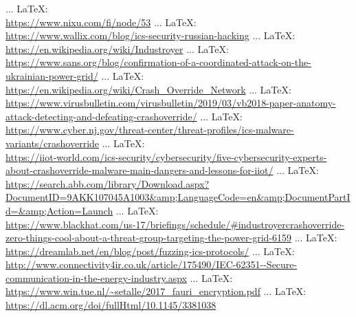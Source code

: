 \begin{thebibliography}{99}
{{{{		
		
		
		 ... \LaTeX:\\ \url{https://www.nixu.com/fi/node/53}
		 ... \LaTeX:\\ \url{ https://www.wallix.com/blog/ics-security-russian-hacking}
		 ... \LaTeX:\\ \url{ https://en.wikipedia.org/wiki/Industroyer}
		 ... \LaTeX:\\ \url{https://www.sans.org/blog/confirmation-of-a-coordinated-attack-on-the-ukrainian-power-grid/}
		 ... \LaTeX:\\ \url{https://en.wikipedia.org/wiki/Crash_Override_Network}
		 ... \LaTeX:\\ \url{ https://www.virusbulletin.com/virusbulletin/2019/03/vb2018-paper-anatomy-attack-detecting-and-defeating-crashoverride/}
		 ... \LaTeX:\\ \url{ https://www.cyber.nj.gov/threat-center/threat-profiles/ics-malware-variants/crashoverride}
		 ... \LaTeX:\\ \url{https://iiot-world.com/ics-security/cybersecurity/five-cybersecurity-experts-about-crashoverride-malware-main-dangers-and-lessons-for-iiot/}
		 ... \LaTeX:\\ \url{ https://search.abb.com/library/Download.aspx?DocumentID=9AKK107045A1003&amp;LanguageCode=en&amp;DocumentPartId=&amp;Action=Launch}
		 ... \LaTeX:\\ \url{ https://www.blackhat.com/us-17/briefings/schedule/#industroyercrashoverride-zero-things-cool-about-a-threat-group-targeting-the-power-grid-6159}
		 ... \LaTeX:\\ \url{https://dreamlab.net/en/blog/post/fuzzing-ics-protocols/}
		 ... \LaTeX:\\ \url{http://www.connectivity4ir.co.uk/article/175490/IEC-62351--Secure-communication-in-the-energy-industry.aspx}
		 ... \LaTeX:\\ \url{https://www.win.tue.nl/~setalle/2017_fauri_encryption.pdf}
		 ... \LaTeX:\\ \url{https://dl.acm.org/doi/fullHtml/10.1145/3381038}
}}}}
\end{thebibliography}
